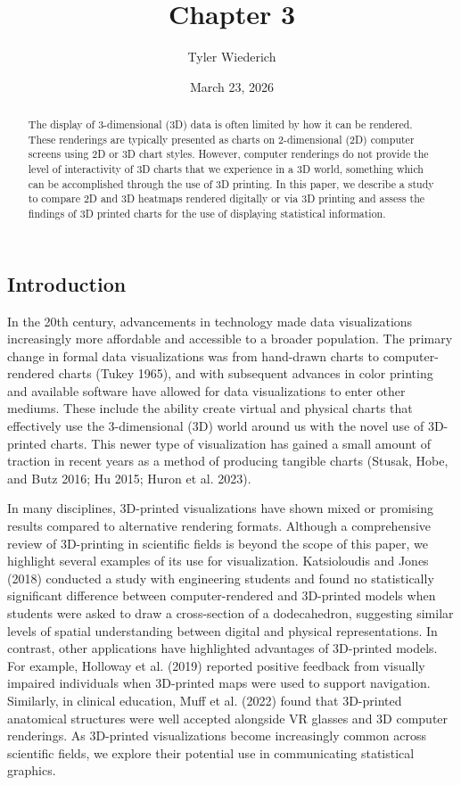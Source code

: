 \documentclass[
  letterpaper,
  DIV=11,
  numbers=noendperiod]{scrartcl}
\title{Chapter 3}
\author{Tyler Wiederich}
\date{March 23, 2026}
\begin{document}
\maketitle
\begin{abstract}
The display of 3-dimensional (3D) data is often limited by how it can be
rendered. These renderings are typically presented as charts on
2-dimensional (2D) computer screens using 2D or 3D chart styles.
However, computer renderings do not provide the level of interactivity
of 3D charts that we experience in a 3D world, something which can be
accomplished through the use of 3D printing. In this paper, we describe
a study to compare 2D and 3D heatmaps rendered digitally or via 3D
printing and assess the findings of 3D printed charts for the use of
displaying statistical information.
\end{abstract}


\subsection{Introduction}\label{introduction}

In the 20th century, advancements in technology made data visualizations
increasingly more affordable and accessible to a broader population. The
primary change in formal data visualizations was from hand-drawn charts
to computer-rendered charts (Tukey 1965), and with subsequent advances
in color printing and available software have allowed for data
visualizations to enter other mediums. These include the ability create
virtual and physical charts that effectively use the 3-dimensional (3D)
world around us with the novel use of 3D-printed charts. This newer type
of visualization has gained a small amount of traction in recent years
as a method of producing tangible charts (Stusak, Hobe, and Butz 2016;
Hu 2015; Huron et al. 2023).

In many disciplines, 3D-printed visualizations have shown mixed or
promising results compared to alternative rendering formats. Although a
comprehensive review of 3D-printing in scientific fields is beyond the
scope of this paper, we highlight several examples of its use for
visualization. Katsioloudis and Jones (2018) conducted a study with
engineering students and found no statistically significant difference
between computer-rendered and 3D-printed models when students were asked
to draw a cross-section of a dodecahedron, suggesting similar levels of
spatial understanding between digital and physical representations. In
contrast, other applications have highlighted advantages of 3D-printed
models. For example, Holloway et al. (2019) reported positive feedback
from visually impaired individuals when 3D-printed maps were used to
support navigation. Similarly, in clinical education, Muff et al. (2022)
found that 3D-printed anatomical structures were well accepted alongside
VR glasses and 3D computer renderings. As 3D-printed visualizations
become increasingly common across scientific fields, we explore their
potential use in communicating statistical graphics.
\end{document}
